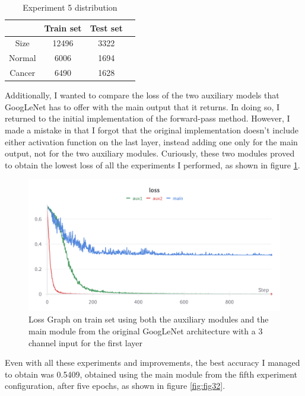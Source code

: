 \begin{table}[ht!]
\centering
\begin{tabular}{|c|c|c|c|}
    \hline
    & Train set & Test set \\ \hline
    Size & 12496 & 3322 \\ \hline
    Normal & 6006 & 1694\\ \hline
    Cancer & 6490 & 1628\\ \hline
    \end{tabular}
    \caption{Experiment 5 distribution}
    \label{tab:tab3}
\end{table}

Additionally, I wanted to compare the loss of the two auxiliary models that GoogLeNet has to offer with the main output that it returns. In doing so, I returned to the initial implementation of the forward-pass method. However, I made a mistake in that I forgot that the original implementation doesn't include either activation function on the last layer, instead adding one only for the main output, not for the two auxiliary modules. Curiously, these two modules proved to obtain the lowest loss of all the experiments I performed, as shown in figure \ref{fig:fig18}.

\begin{figure}[ht]
    \centering
    \includegraphics[width=0.75\linewidth]{figures/Figure19.png}
    \caption{Loss Graph on train set using both the auxiliary modules and the main module from the original GoogLeNet architecture with a 3 channel input for the first layer}
    \label{fig:fig18}
\end{figure}

Even with all these experiments and improvements, the best accuracy I managed to obtain was 0.5409, obtained using the main module from the fifth experiment configuration, after five epochs, as shown in figure \ref{fig:fig32}.

